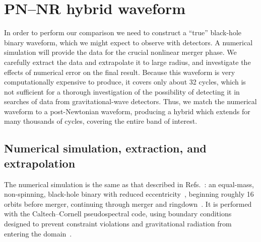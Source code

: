 

\section{PN--NR hybrid waveform}
\label{sec:PNNRHybridWaveform} %


In order to perform our comparison we need to construct a ``true''
black-hole binary waveform, which we might expect to observe with
detectors.  A numerical simulation will provide the data for the
crucial nonlinear merger phase.  We carefully extract the data and
extrapolate it to large radius, and investigate the effects of
numerical error on the final result.  Because this waveform is very
computationally expensive to produce, it covers only about 32 cycles,
which is not sufficient for a thorough investigation of the
possibility of detecting it in searches of data from
gravitational-wave detectors.  Thus, we match the numerical waveform
to a post-Newtonian waveform, producing a hybrid which extends for
many thousands of cycles, covering the entire band of interest.

\subsection{Numerical simulation, extraction, and extrapolation}
\label{sec:WaveformExtractionAndExtrapolation}
The numerical simulation is the same as that described in
Refs.~\cite{Boyle2007, Scheel2008}: an equal-mass, non-spinning,
black-hole binary with reduced
eccentricity~\cite{Pfeiffer-Brown-etal:2007}, beginning roughly 16
orbits before merger, continuing through merger and
ringdown~\cite{Scheel2008}.  It is performed with the Caltech--Cornell
pseudospectral code, using boundary conditions designed to prevent
constraint violations and gravitational radiation from entering the
domain~\cite{Holst2004, Lindblom2006}.

